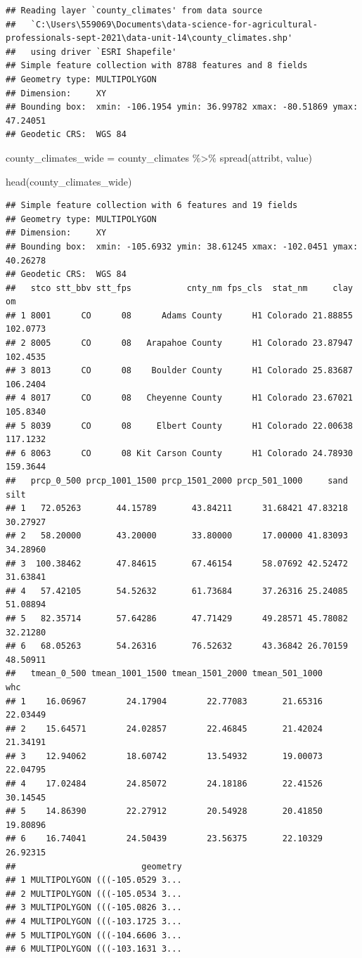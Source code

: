 \documentclass[
]{book}
\newenvironment{Shaded}{\begin{snugshade}}{\end{snugshade}}
\newcommand{\FunctionTok}[1]{\textcolor[rgb]{0.00,0.00,0.00}{#1}}
\newcommand{\NormalTok}[1]{#1}
\newcommand{\OtherTok}[1]{\textcolor[rgb]{0.56,0.35,0.01}{#1}}
\newcommand{\SpecialCharTok}[1]{\textcolor[rgb]{0.00,0.00,0.00}{#1}}
\begin{document}
\begin{verbatim}
## Reading layer `county_climates' from data source 
##   `C:\Users\559069\Documents\data-science-for-agricultural-professionals-sept-2021\data-unit-14\county_climates.shp' 
##   using driver `ESRI Shapefile'
## Simple feature collection with 8788 features and 8 fields
## Geometry type: MULTIPOLYGON
## Dimension:     XY
## Bounding box:  xmin: -106.1954 ymin: 36.99782 xmax: -80.51869 ymax: 47.24051
## Geodetic CRS:  WGS 84
\end{verbatim}

\begin{Shaded}
\begin{Highlighting}[]
\NormalTok{county\_climates\_wide }\OtherTok{=}\NormalTok{ county\_climates }\SpecialCharTok{\%\textgreater{}\%}
  \FunctionTok{spread}\NormalTok{(attribt, value)}

\FunctionTok{head}\NormalTok{(county\_climates\_wide)}
\end{Highlighting}
\end{Shaded}

\begin{verbatim}
## Simple feature collection with 6 features and 19 fields
## Geometry type: MULTIPOLYGON
## Dimension:     XY
## Bounding box:  xmin: -105.6932 ymin: 38.61245 xmax: -102.0451 ymax: 40.26278
## Geodetic CRS:  WGS 84
##   stco stt_bbv stt_fps           cnty_nm fps_cls  stat_nm     clay       om
## 1 8001      CO      08      Adams County      H1 Colorado 21.88855 102.0773
## 2 8005      CO      08   Arapahoe County      H1 Colorado 23.87947 102.4535
## 3 8013      CO      08    Boulder County      H1 Colorado 25.83687 106.2404
## 4 8017      CO      08   Cheyenne County      H1 Colorado 23.67021 105.8340
## 5 8039      CO      08     Elbert County      H1 Colorado 22.00638 117.1232
## 6 8063      CO      08 Kit Carson County      H1 Colorado 24.78930 159.3644
##   prcp_0_500 prcp_1001_1500 prcp_1501_2000 prcp_501_1000     sand     silt
## 1   72.05263       44.15789       43.84211      31.68421 47.83218 30.27927
## 2   58.20000       43.20000       33.80000      17.00000 41.83093 34.28960
## 3  100.38462       47.84615       67.46154      58.07692 42.52472 31.63841
## 4   57.42105       54.52632       61.73684      37.26316 25.24085 51.08894
## 5   82.35714       57.64286       47.71429      49.28571 45.78082 32.21280
## 6   68.05263       54.26316       76.52632      43.36842 26.70159 48.50911
##   tmean_0_500 tmean_1001_1500 tmean_1501_2000 tmean_501_1000      whc
## 1    16.06967        24.17904        22.77083       21.65316 22.03449
## 2    15.64571        24.02857        22.46845       21.42024 21.34191
## 3    12.94062        18.60742        13.54932       19.00073 22.04795
## 4    17.02484        24.85072        24.18186       22.41526 30.14545
## 5    14.86390        22.27912        20.54928       20.41850 19.80896
## 6    16.74041        24.50439        23.56375       22.10329 26.92315
##                         geometry
## 1 MULTIPOLYGON (((-105.0529 3...
## 2 MULTIPOLYGON (((-105.0534 3...
## 3 MULTIPOLYGON (((-105.0826 3...
## 4 MULTIPOLYGON (((-103.1725 3...
## 5 MULTIPOLYGON (((-104.6606 3...
## 6 MULTIPOLYGON (((-103.1631 3...
\end{verbatim}
\end{document}
